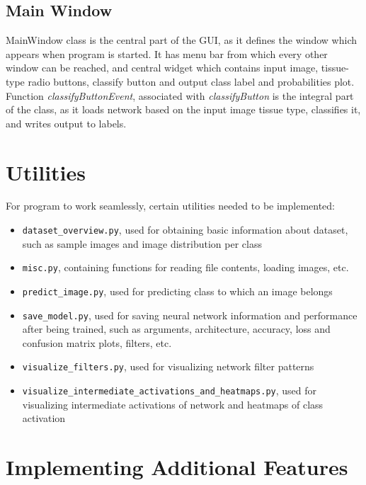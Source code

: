 \subsection{Main Window}

MainWindow class is the central part of the GUI, as it defines the window which appears when program is started. It has menu bar from which every other window can be reached, and central widget which contains input image, tissue-type radio buttons, classify button and output class label and probabilities plot. Function \emph{classifyButtonEvent}, associated with \emph{classifyButton} is the integral part of the class, as it loads network based on the input image tissue type, classifies it, and writes output to labels.


\section{Utilities}
\label{utils}

For program to work seamlessly, certain utilities needed to be implemented:
\begin{itemize}
	\itemsep 0em
	\item \texttt{dataset\_overview.py}, used for obtaining basic information about dataset, such as sample images and image distribution per class
	\item \texttt{misc.py}, containing functions for reading file contents, loading images, etc. 
	\item \texttt{predict\_image.py}, used for predicting class to which an image belongs
	\item \texttt{save\_model.py}, used for saving neural network information and performance after being trained, such as arguments, architecture, accuracy, loss and confusion matrix plots, filters, etc.  
	\item \texttt{visualize\_filters.py}, used for visualizing network filter patterns
	\item \texttt{visualize\_intermediate\_activations\_and\_heatmaps.py}, used for visualizing intermediate activations of network and heatmaps of class activation
\end{itemize}

\section{Implementing Additional Features}

